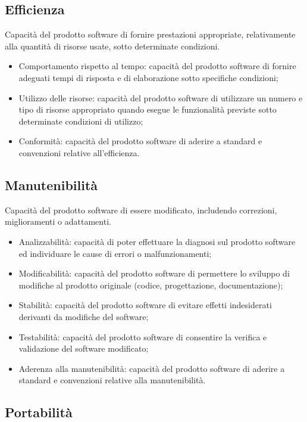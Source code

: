 \subsection{Efficienza}
Capacità del prodotto software di fornire prestazioni appropriate, relativamente alla quantità di risorse usate, sotto determinate condizioni.

\begin{itemize}
    \item Comportamento rispetto al tempo: capacità del prodotto software di fornire adeguati tempi di risposta e di elaborazione sotto specifiche condizioni;
    \item Utilizzo delle risorse: capacità del prodotto software di utilizzare un numero e tipo di risorse appropriato quando esegue le funzionalità previste sotto determinate condizioni di utilizzo;
    \item Conformità: capacità del prodotto software di aderire a standard e convenzioni relative all'efficienza.
\end{itemize}

\subsection{Manutenibilità}
Capacità del prodotto software di essere modificato, includendo correzioni, miglioramenti o adattamenti.

\begin{itemize}
    \item Analizzabilità: capacità di poter effettuare la diagnosi sul prodotto software ed individuare le cause di errori o malfunzionamenti;
    \item  Modificabilità: capacità del prodotto software di permettere lo sviluppo di modifiche al prodotto originale (codice, progettazione, documentazione);
    \item Stabilità: capacità del prodotto software di evitare effetti indesiderati derivanti da modifiche del software;
    \item Testabilità: capacità del prodotto software di consentire la verifica e validazione del software modificato;
    \item Aderenza alla manutenibilità: capacità del prodotto software di aderire a standard e convenzioni relative alla manutenibilità.
\end{itemize}

\subsection{Portabilità}

